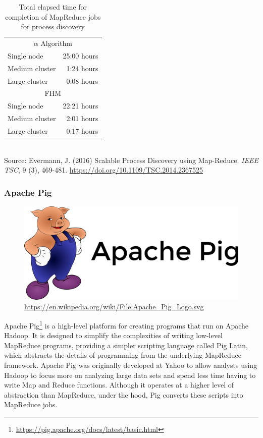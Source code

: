 \begin{table}
\centering

\begin{tabular}{lr} \hline
\multicolumn{2}{c}{$\alpha$ Algorithm} \\
Single node & 25:00 hours \\
Medium cluster & 1:24 hours \\
Large cluster & 0:08 hours \\ \hline
\multicolumn{2}{c}{FHM} \\
Single node & 22:21 hours\\
Medium cluster & 2:01 hours \\
Large cluster & 0:17 hours \\ \hline
\end{tabular} \\

\vspace{\baselineskip}
\scriptsize
Source: Evermann, J. (2016) Scalable Process Discovery using Map-Reduce. \emph{IEEE TSC}, 9 (3), 469-481. \footnotesize \url{https://doi.org/10.1109/TSC.2014.2367525}
\caption[MapReduce performance for process discovery]{Total elapsed time for completion of MapReduce jobs for process discovery}
\label{tab:processdiscoveryresults}
\end{table}

\FloatBarrier
\subsubsection*{Apache Pig}

\begin{figure}
\begin{center}
\includegraphics[width=.25\textwidth]{pig_logo.png} \\
\tiny\url{https://en.wikipedia.org/wiki/File:Apache_Pig_Logo.svg}
\end{center}
\end{figure}
Apache Pig\footnote{\url{https://pig.apache.org/docs/latest/basic.html}} is a high-level platform for creating programs that run on Apache Hadoop. It is designed to simplify the complexities of writing low-level MapReduce programs, providing a simpler scripting language called Pig Latin, which abstracts the details of programming from the underlying MapReduce framework. Apache Pig was originally developed at Yahoo to allow analysts using Hadoop to focus more on analyzing large data sets and spend less time having to write Map and Reduce functions. Although it operates at a higher level of abstraction than MapReduce, under the hood, Pig converts these scripts into MapReduce jobs.

